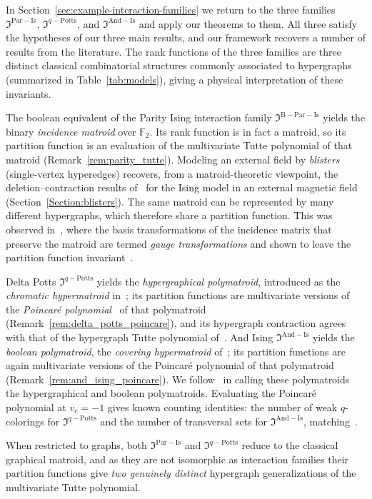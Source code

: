 \documentclass[11pt,reqno]{amsart}
\newcommand{\mci}{\mathfrak{I}^{\mathrm{Par-Is}}}
\newcommand{\mcib}{\mathfrak{I}^{\mathrm{B-Par-Is}}}
\newcommand{\mcp}{\mathfrak{I}^{q-\mathrm{Potts}}}
\newcommand{\mca}{\mathfrak{I}^{\mathrm{And-Is}}}
\theoremstyle{plain}
\theoremstyle{definition}
\numberwithin{equation}{section}
\begin{document}
In Section~\ref{sec:example-interaction-families} we return to the three
families $\mci$, $\mcp$, and $\mca$ and apply our theorems to them. All
three satisfy the hypotheses of our three main results, and our framework recovers a number of results from the literature. The rank functions of the three families are three
distinct classical combinatorial structures commonly associated to hypergraphs (summarized in Table~\ref{tab:models}), giving a physical interpretation of these invariants. 

The boolean equivalent of the Parity Ising interaction family $\mcib$ yields the binary \emph{incidence matroid} over
$\mathbb{F}_2$. Its rank function is in fact a matroid, so its partition
function is an evaluation of the multivariate Tutte polynomial of that
matroid (Remark~\ref{rem:parity_tutte}). Modeling an external field by \emph{blisters} (single-vertex hyperedges) recovers, from a
matroid-theoretic viewpoint, the deletion--contraction results
of~\cite{zbMATH05956368} for the Ising model in an external magnetic
field (Section~\ref{Section:blisters}). The same matroid can be
represented by many different hypergraphs, which therefore share a
partition function. This was observed in~\cite{spinmod}, where the basis
transformations of the incidence matrix that preserve the matroid are
termed \emph{gauge transformations} and shown to leave the partition
function invariant~\cite{spinmod, deClercq2026}.

Delta Potts $\mcp$ yields the \emph{hypergraphical polymatroid},
introduced as the \emph{chromatic hypermatroid} in~\cite{Helg}; its partition functions are multivariate versions of the \emph{Poincar\'e
polynomial}~\cite{Helg} of that polymatroid (Remark~\ref{rem:delta_potts_poincare}), and its hypergraph contraction
agrees with that of the hypergraph Tutte polynomial
of~\cite{Berrekkal2026}. And Ising $\mca$ yields the \emph{boolean
polymatroid}, the \emph{covering hypermatroid} of~\cite{Helg}; its partition functions are again multivariate versions of the
Poincar\'e polynomial of that polymatroid
(Remark~\ref{rem:and_ising_poincare}). We follow~\cite{Vertigan_Whittle_1993}
in calling these polymatroids the hypergraphical and boolean polymatroids. Evaluating
the Poincar\'e polynomial at $v_e = -1$ gives known counting identities:
the number of weak $q$-colorings for $\mcp$ and the number of transversal
sets for $\mca$, matching~\cite{Helg}.

When restricted to graphs, both $\mci$ and $\mcp$ reduce to the classical
graphical matroid, and as they are not isomorphic as interaction families their partition functions give \emph{two genuinely
distinct} hypergraph generalizations of the multivariate Tutte
polynomial.
\end{document}
